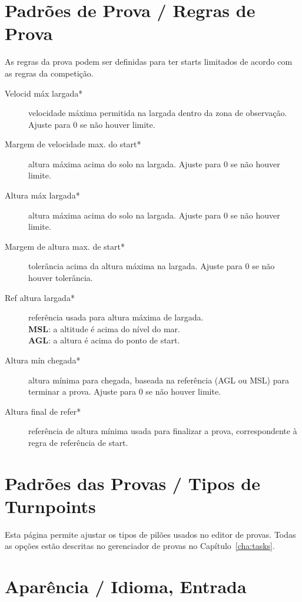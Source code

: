 \section{Padrões de Prova / Regras de Prova}

As regras da prova podem ser definidas para ter starts limitados de acordo com as regras da competição. \label{conf:taskrules}

\begin{description}
\item[Velocid máx largada*]  velocidade máxima permitida na largada dentro da zona de observação.  Ajuste para 0 se não houver limite.
\item[Margem de velocidade max. do start*] altura máxima acima do solo na largada.  Ajuste para 0 se não houver limite.
\item[Altura máx largada*]  altura máxima acima do solo na largada.  Ajuste para 0 se não houver limite.
\item[Margem de altura max. de start*]  tolerância acima da altura máxima na largada.  Ajuste para 0 se não houver tolerância.
\item[Ref altura largada*]  referência usada para altura máxima de largada. \\
  {\bf MSL}: a altitude é acima do nível do mar. \\
  {\bf AGL}: a altura é acima do ponto de start.
\item[Altura mín chegada*]  altura mínima para chegada, baseada na referência (AGL ou MSL) para terminar a prova.  Ajuste para 0 se não houver limite.
\item[Altura final de refer*]  referência de altura mínima usada para finalizar a prova, correspondente à regra de referência de start.
\end{description}


\section{Padrões das Provas / Tipos de Turnpoints}

Esta página permite ajustar os tipos de pilões usados no editor de provas.  Todas as opções estão descritas no gerenciador de provas no Capítulo~\ref{cha:tasks}.


\section{Aparência / Idioma, Entrada}\label{sec:interface}

